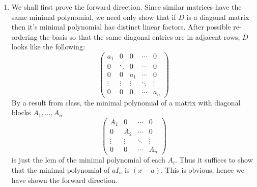 \documentclass[12pt]{article}
\theoremstyle{definitionstyle}
\begin{document}
\begin{enumerate}
		\item We shall first prove the forward direction. Since similar matrices have the same minimal polynomial, we need only show that if $D$ is a diagonal matrix then it's minimal polynomial has distinct linear factors. After possible re-ordering the basis so that the same diagonal entries are in adjacent rows, $D$ looks like the following:
		$$\begin{pmatrix}
			a_1 & 0 & 0 & \cdots & 0 \\
			0 & \ddots & 0 & \cdots & 0 \\
			0 & 0 & a_1 & \cdots & 0 \\
			\vdots & \vdots & \vdots & \ddots & \vdots \\
			0 & 0 & 0 & \cdots & a_n
		\end{pmatrix}$$
		By a result from class, the minimal polynomial of a matrix with diagonal blocks $A_1, \ldots, A_n$
		$$\begin{pmatrix}
			A_1 & 0 & \cdots & 0 \\
			0 & A_2 & \cdots & 0 \\
			\vdots & \vdots & \ddots & \vdots \\
			0 & 0 & \cdots & A_n
		\end{pmatrix}$$
		is just the lcm of the minimal polynomial of each $A_i$. Thus it suffices to show that the minimal polynomial of $aI_n$ is $(x-a)$. This is obvious, hence we have shown the forward direction.
		

\end{enumerate}
\end{document}
